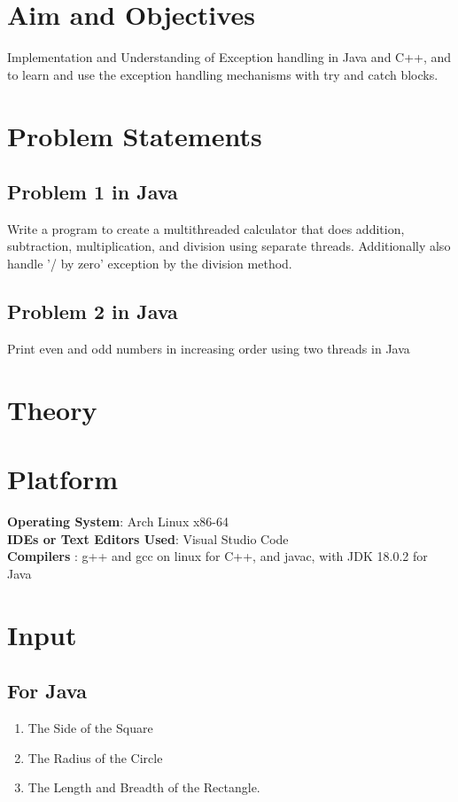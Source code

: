 \documentclass[11pt]{article}
\begin{document}
\tableofcontents
\thispagestyle{empty}
\clearpage


\setcounter{page}{1}

\section{Aim and Objectives}
Implementation and Understanding of Exception handling in Java and C++, and to learn and use the exception handling mechanisms with try and catch blocks.

\section{Problem Statements}

\subsection{Problem 1 in Java}
Write a program to create a multithreaded calculator that does addition, subtraction,
multiplication, and division using separate threads.
Additionally also handle '/ by zero' exception by the division method.

\subsection{Problem 2 in Java}
Print even and odd numbers in increasing order using two threads in Java

\section{Theory}

\section{Platform}
\textbf{Operating System}: Arch Linux x86-64 \\
\textbf{IDEs or Text Editors Used}: Visual Studio Code\\
\textbf{Compilers} : g++ and gcc on linux for C++, and javac, with JDK 18.0.2 for Java\\

\section{Input}
\subsection*{For Java}
\begin{enumerate}
	\item The Side of the Square
	\item The Radius of the Circle
	\item The Length and Breadth of the Rectangle.
\end{enumerate}
\end{document}
